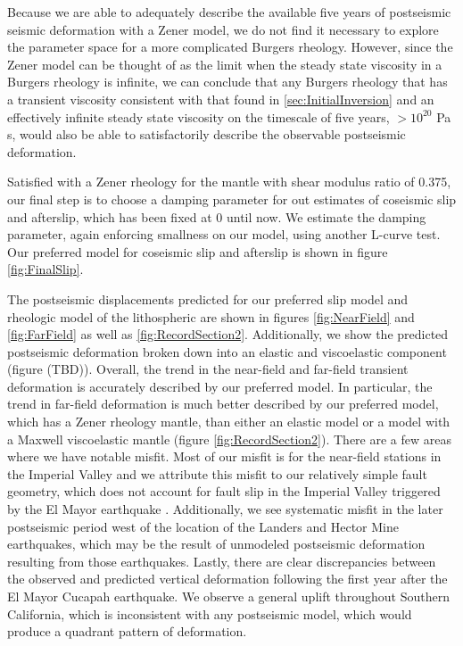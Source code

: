 \documentclass[1p]{elsarticle}
\begin{document}
Because we are able to adequately  describe the available five years of postseismic seismic deformation with a Zener model, we do not find it necessary to explore the parameter space for a more complicated Burgers rheology.  However, since the Zener model can be thought of as the limit when the steady state viscosity in a Burgers rheology is infinite, we can conclude that any Burgers rheology that has a transient viscosity consistent with that found in \ref{sec:InitialInversion} and an effectively infinite steady state viscosity on the timescale of five years, $>10^{20}$ Pa s, would also be able to satisfactorily describe the observable postseismic deformation.        

Satisfied with a Zener rheology for the mantle with shear modulus ratio of 0.375, our final step is to choose a damping parameter for out estimates of coseismic slip and afterslip, which has been fixed at 0 until now.  We estimate the damping parameter, again enforcing smallness on our model, using another L-curve test.  Our preferred model for coseismic slip and afterslip is shown in figure \ref{fig:FinalSlip}.  

The postseismic displacements predicted for our preferred slip model and rheologic model of the lithospheric are shown in figures \ref{fig:NearField} and \ref{fig:FarField} as well as \ref{fig:RecordSection2}.  Additionally, we show the predicted postseismic deformation broken down into an elastic and viscoelastic component (figure (TBD)).  Overall, the trend in the near-field and far-field transient deformation is accurately described by our preferred model.  In particular, the trend in far-field deformation is much better described by our preferred model, which has a Zener rheology mantle, than either an elastic model or a model with a Maxwell viscoelastic mantle (figure \ref{fig:RecordSection2}).  There are a few areas where we have notable misfit.  Most of our misfit is for the near-field stations in the Imperial Valley and we attribute this misfit to our relatively simple fault geometry, which does not account for fault slip in the Imperial Valley triggered by the El Mayor earthquake \citep{Wei2011a,Wei2015}.
Additionally, we see systematic misfit in the later postseismic period west of the location of the Landers and Hector Mine earthquakes, which may be the result of unmodeled postseismic deformation resulting from those earthquakes.  Lastly, there are clear discrepancies between the observed and predicted vertical deformation following the first year after the El Mayor Cucapah earthquake. We observe a general uplift throughout Southern California, which is inconsistent with any postseismic model, which would produce a quadrant pattern of deformation.
\end{document}

